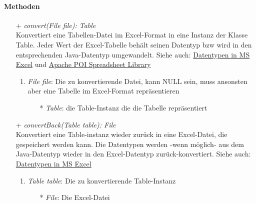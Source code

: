 \paragraph{Methoden}
\begin{itemize}
	\item[+] \textit{convert(File file): Table} \\
	Konvertiert eine Tabellen-Datei im Excel-Format in eine Instanz der Klasse Table.
	Jeder Wert der Excel-Tabelle behält seinen Datentyp bzw wird in den entsprechenden Java-Datentyp umgewandelt.
	Siehe auch: \href{https://support.office.com/en-us/article/data-types-in-data-models-e2388f62-6122-4e2b-bcad-053e3da9ba90#__toc327893213}{Datentypen in MS Excel} und \href{http://poi.apache.org/spreadsheet/}{Apache POI Spreadsheet Library}
	\begin{enumerate}
		\item \textit{File file}: Die zu konvertierende Datei, kann NULL sein, muss ansonsten aber eine Tabelle im Excel-Format repräsentieren
		\begin{itemize}
			\item[*] \textit{Table}: die Table-Instanz die die Tabelle repräsentiert
		\end{itemize}
	\end{enumerate}
	
	\item[+] \textit{convertBack(Table table): File} \\
	Konvertiert eine Table-instanz wieder zurück in eine Excel-Datei, die gespeichert werden kann.
	Die Datentypen werden -wenn möglich- aus dem Java-Datentyp wieder in den Excel-Datentyp zurück-konvertiert.
	Siehe auch: \href{https://support.office.com/en-us/article/data-types-in-data-models-e2388f62-6122-4e2b-bcad-053e3da9ba90#__toc327893213}{Datentypen in MS Excel}
	\begin{enumerate}
		\item \textit{Table table}: Die zu konvertierende Table-Instanz
		\begin{itemize}
			\item[*] \textit{File}: Die Excel-Datei
		\end{itemize}
	\end{enumerate}
\end{itemize}